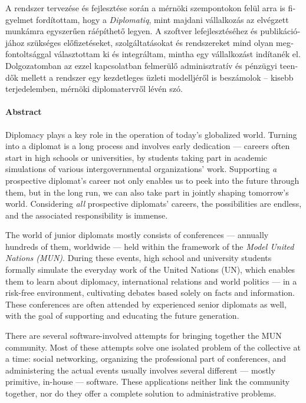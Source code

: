 \begin{otherlanguage}{magyar}
A rendszer tervezése és fejlesztése során a mérnöki szempontokon felül arra is figyelmet fordítottam, hogy a \emph{Diplomatiq}, mint majdani vállalkozás az elvégzett munkámra egyszerűen ráépíthető legyen. A szoftver lefejlesztéséhez és publikációjához szükséges előfizetéseket, szolgáltatásokat és rendszereket mind olyan megfontoltsággal választottam ki és integráltam, mintha egy vállalkozást indítanék el. Dolgozatomban az ezzel kapcsolatban felmerülő adminisztratív és pénzügyi teendők mellett a rendszer egy kezdetleges üzleti modelljéről is beszámolok – kisebb terjedelemben, mérnöki diplomatervről lévén szó.

\end{otherlanguage}

\clearpage

\paragraph*{Abstract}
{}
\thispagestyle{plain}

Diplomacy plays a key role in the operation of today's globalized world. Turning into a diplomat is a long process and involves early dedication — careers often start in high schools or universities, by students taking part in academic simulations of various intergovernmental organizations' work. Supporting \emph{a} prospective diplomat's career not only enables us to peek into the future through them, but in the long run, we can also take part in jointly shaping tomorrow's world. Considering \emph{all} prospective diplomats' careers, the possibilities are endless, and the associated responsibility is immense.

The world of junior diplomats mostly consists of conferences — annually hundreds of them, worldwide — held within the framework of the \emph{Model United Nations (MUN)}. During these events, high school and university students formally simulate the everyday work of the United Nations (UN), which enables them to learn about diplomacy, international relations and world politics — in a risk-free environment, cultivating debates based solely on facts and information. These conferences are often attended by experienced senior diplomats as well, with the goal of supporting and educating the future generation.

There are several software-involved attempts for bringing together the MUN community. Most of these attempts solve one isolated problem of the collective at a time: social networking, organizing the professional part of conferences, and administering the actual events usually involves several different — mostly primitive, in-house — software. These applications neither link the community together, nor do they offer a complete solution to administrative problems.

